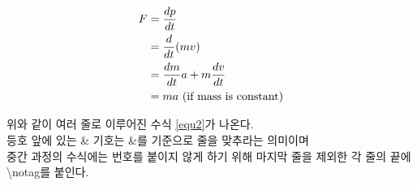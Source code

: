 \begin{align}
	F &= \frac{dp}{dt} \notag\\
	&= \frac{d}{dt}(mv) \notag \\
	&= \frac{dm}{dt}a + m\frac{dv}{dt} \notag \\
	&= ma \textrm{ (if mass is constant)} \label{equ2}
\end{align}

\noindent 위와 같이 여러 줄로 이루어진 수식 \ref{equ2}가 나온다. \\
등호 앞에 있는 \& 기호는 \&를 기준으로 줄을 맞추라는 의미이며 \\
중간 과정의 수식에는 번호를 붙이지 않게 하기 위해 마지막 줄을 제외한 각 줄의 끝에 \textbackslash notag를 붙인다.\\